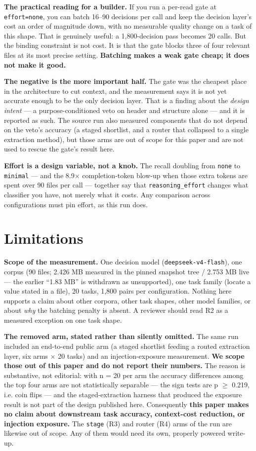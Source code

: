 \documentclass[11pt,a4paper]{article}
\begin{document}
\textbf{The practical reading for a builder.} If you run a per-read gate at \texttt{effort=none}, you can batch 16--90 decisions per call and keep the decision layer's cost an order of magnitude down, with no measurable quality change on a task of this shape. That is genuinely useful: a 1,800-decision pass becomes 20 calls. But the binding constraint is not cost. It is that the gate blocks three of four relevant files at its most precise setting. \textbf{Batching makes a weak gate cheap; it does not make it good.}

\textbf{The negative is the more important half.} The gate was the cheapest place in the architecture to cut context, and the measurement says it is not yet accurate enough to be the only decision layer. That is a finding about the \emph{design intent} --- a purpose-conditioned veto on header and structure alone --- and it is reported as such. The source run also measured components that do not depend on the veto's accuracy (a staged shortlist, and a router that collapsed to a single extraction method), but those arms are out of scope for this paper and are not used to rescue the gate's result here.

\textbf{Effort is a design variable, not a knob.} The recall doubling from \texttt{none} to \texttt{minimal} --- and the 8.9$\times$ completion-token blow-up when those extra tokens are spent over 90 files per call --- together say that \texttt{reasoning\_effort} changes what classifier you have, not merely what it costs. Any comparison across configurations must pin effort, as this run does.

\section{Limitations}

\textbf{Scope of the measurement.} One decision model (\texttt{deepseek-v4-flash}), one corpus (90 files; 2.426 MB measured in the pinned snapshot tree / 2.753 MB live --- the earlier ``1.83 MB'' is withdrawn as unsupported), one task family (locate a value stated in a file), 20 tasks, 1,800 pairs per configuration. Nothing here supports a claim about other corpora, other task shapes, other model families, or about \emph{why} the batching penalty is absent. A reviewer should read R2 as a measured exception on one task shape.

\textbf{The removed arm, stated rather than silently omitted.} The same run included an end-to-end public arm (a staged shortlist feeding a routed extraction layer, six arms $\times$ 20 tasks) and an injection-exposure measurement. \textbf{We scope those out of this paper and do not report their numbers.} The reason is substantive, not editorial: with n = 20 per arm the accuracy differences among the top four arms are not statistically separable --- the sign tests are p $\ge$ 0.219, i.e. coin flips --- and the staged-extraction harness that produced the exposure result is not part of the design published here. Consequently \textbf{this paper makes no claim about downstream task accuracy, context-cost reduction, or injection exposure.} The \texttt{stage} (R3) and router (R4) arms of the run are likewise out of scope. Any of them would need its own, properly powered write-up.
\end{document}
